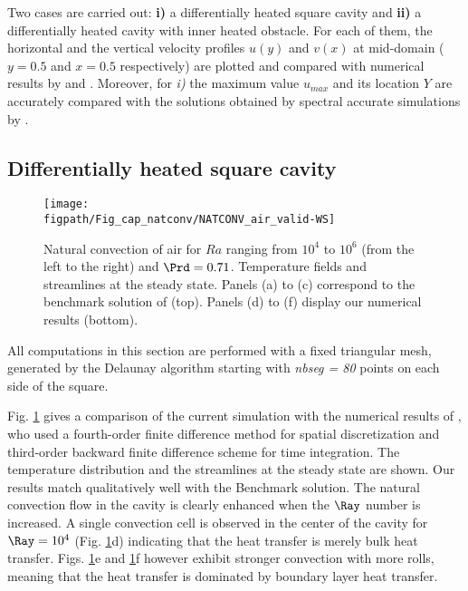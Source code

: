 Two cases are carried out: \textbf{ i)} a differentially heated square cavity and \textbf{ ii)} a differentially heated cavity with inner heated obstacle.
For each of them, the horizontal and the vertical velocity profiles $u(y)$ and $v(x)$ at mid-domain ($y=0.5$ and $x=0.5$ respectively) are plotted and compared with numerical results by \cite{LeQuere91} and \cite{Raluca2013}. 
Moreover, for \textit{ i)} the maximum value $u_{max}$ and its location $Y$ are accurately compared with the solutions obtained by spectral accurate simulations by \cite{LeQuere91}.

\subsection{Differentially heated square cavity} \label{sub-diff-heated}

\begin{figure}[!ht]
	\begin{center}
		\texttt{[image: \\figpath/Fig\_cap\_natconv/NATCONV\_air\_valid-WS]} 
	\end{center}
	\caption{Natural convection of air for $Ra$ ranging from $10^4$ to $10^6$ (from the left to the right) and $\Prd = 0.71$. Temperature fields and streamlines at the steady state. Panels (a) to (c) correspond to the benchmark solution of \cite{Wakashima-2004} (top). Panels (d) to (f) display our numerical results (bottom).}
	\label{fig-natconv-field}
\end{figure}

All computations in this section are performed with a fixed triangular mesh, generated by the Delaunay algorithm starting with {\em nbseg = 80} points on each side of the square.

Fig. \ref{fig-natconv-field} gives a comparison of the current simulation with the numerical results of \cite{Wakashima-2004}, who
used a fourth-order finite difference method for spatial discretization and third-order backward finite difference scheme for time integration.
The temperature distribution and the streamlines at the steady state are shown.
Our results match qualitatively well with the Benchmark solution.
The natural convection flow in the cavity is clearly enhanced when the $\Ray$ number is increased.
A single convection cell is observed in the center of the cavity for $\Ray = 10^4$ (Fig. \ref{fig-natconv-field}d) indicating that the heat transfer is merely bulk heat transfer.
Figs. \ref{fig-natconv-field}e and \ref{fig-natconv-field}f however exhibit stronger convection with more rolls, meaning that the heat transfer is dominated by boundary layer heat transfer.

